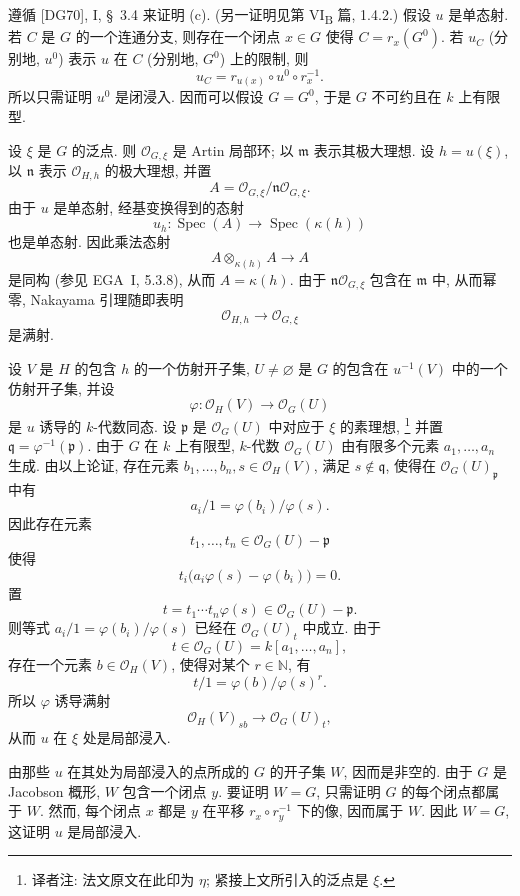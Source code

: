 遵循 \textup{[DG70]}, I, \S~3.4 来证明 (c).
(另一证明见第 VI\textsubscript{B} 篇, 1.4.2.)
假设 \(u\) 是单态射.
若 \(C\) 是 \(G\) 的一个连通分支,
则存在一个闭点 \(x\in G\) 使得 \(C=r_x(G^0)\).
若 \(u_C\) (分别地, \(u^0\)) 表示 \(u\) 在 \(C\)
(分别地, \(G^0\)) 上的限制, 则
\[
  u_C=r_{u(x)}\circ u^0\circ r_x^{-1}.
\]
所以只需证明 \(u^0\) 是闭浸入.
因而可以假设 \(G=G^0\),
于是 \(G\) 不可约且在 \(k\) 上有限型.

设 \(\xi\) 是 \(G\) 的泛点.
则 \(\mathcal O_{G,\xi}\) 是 Artin 局部环;
以 \(\mathfrak m\) 表示其极大理想.
设 \(h=u(\xi)\), 以 \(\mathfrak n\) 表示
\(\mathcal O_{H,h}\) 的极大理想, 并置
\[
  A=\mathcal O_{G,\xi}/\mathfrak n\mathcal O_{G,\xi}.
\]
由于 \(u\) 是单态射, 经基变换得到的态射
\[
  u_h:\operatorname{Spec}(A)\longrightarrow
      \operatorname{Spec}(\kappa(h))
\]
也是单态射. 因此乘法态射
\[
  A\otimes_{\kappa(h)}A\longrightarrow A
\]
是同构 (参见 EGA~I, 5.3.8), 从而 \(A=\kappa(h)\).
由于 \(\mathfrak n\mathcal O_{G,\xi}\) 包含在 \(\mathfrak m\) 中,
从而幂零, Nakayama 引理随即表明
\[
  \mathcal O_{H,h}\longrightarrow\mathcal O_{G,\xi}
\]
是满射.

设 \(V\) 是 \(H\) 的包含 \(h\) 的一个仿射开子集,
\(U\ne\varnothing\) 是 \(G\) 的包含在 \(u^{-1}(V)\)
中的一个仿射开子集, 并设
\[
  \varphi:\mathcal O_H(V)\longrightarrow\mathcal O_G(U)
\]
是 \(u\) 诱导的 \(k\)-代数同态.
设 \(\mathfrak p\) 是 \(\mathcal O_G(U)\) 中对应于
\(\xi\) 的素理想,\begingroup
\renewcommand{\thefootnote}{\fnsymbol{footnote}}%
\footnote[1]{译者注: 法文原文在此印为 \(\eta\);
紧接上文所引入的泛点是 \(\xi\).}%
\endgroup
并置 \(\mathfrak q=\varphi^{-1}(\mathfrak p)\).
由于 \(G\) 在 \(k\) 上有限型,
\(k\)-代数 \(\mathcal O_G(U)\) 由有限多个元素
\(a_1,\ldots,a_n\) 生成.
由以上论证, 存在元素 \(b_1,\ldots,b_n,s\in\mathcal O_H(V)\),
满足 \(s\notin\mathfrak q\), 使得在 \(\mathcal O_G(U)_{\mathfrak p}\) 中有
\[
  a_i/1=\varphi(b_i)/\varphi(s).
\]
因此存在元素
\[
  t_1,\ldots,t_n\in\mathcal O_G(U)-\mathfrak p
\]
使得
\[
  t_i\bigl(a_i\varphi(s)-\varphi(b_i)\bigr)=0.
\]
置
\[
  t=t_1\cdots t_n\varphi(s)\in\mathcal O_G(U)-\mathfrak p.
\]
则等式 \(a_i/1=\varphi(b_i)/\varphi(s)\)
已经在 \(\mathcal O_G(U)_t\) 中成立.
由于
\[
  t\in\mathcal O_G(U)=k[a_1,\ldots,a_n],
\]
存在一个元素 \(b\in\mathcal O_H(V)\),
使得对某个 \(r\in\mathbb N\), 有
\[
  t/1=\varphi(b)/\varphi(s)^r.
\]
所以 \(\varphi\) 诱导满射
\[
  \mathcal O_H(V)_{sb}\longrightarrow\mathcal O_G(U)_t,
\]
从而 \(u\) 在 \(\xi\) 处是局部浸入.

由那些 \(u\) 在其处为局部浸入的点所成的 \(G\) 的开子集 \(W\),
因而是非空的.
由于 \(G\) 是 Jacobson 概形, \(W\) 包含一个闭点 \(y\).
要证明 \(W=G\), 只需证明 \(G\) 的每个闭点都属于 \(W\).
然而, 每个闭点 \(x\) 都是 \(y\) 在平移
\(r_x\circ r_y^{-1}\) 下的像, 因而属于 \(W\).
因此 \(W=G\), 这证明 \(u\) 是局部浸入.

